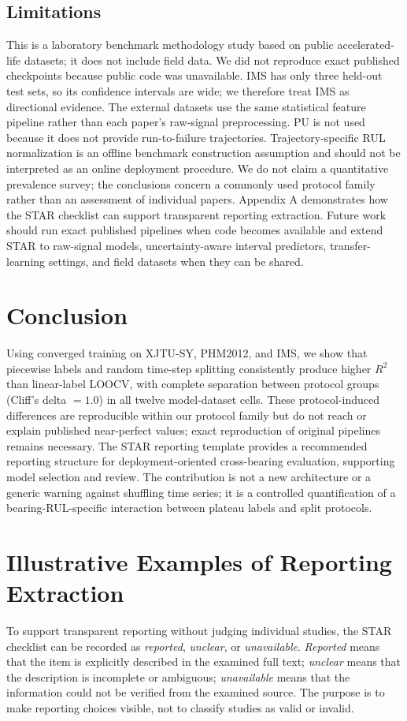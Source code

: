 \documentclass[pdflatex,sn-mathphys-num]{sn-jnl}
\begin{document}
\subsection{Limitations}
This is a laboratory benchmark methodology study based on public accelerated-life datasets; it does not include field data. We did not reproduce exact published checkpoints because public code was unavailable. IMS has only three held-out test sets, so its confidence intervals are wide; we therefore treat IMS as directional evidence. The external datasets use the same statistical feature pipeline rather than each paper's raw-signal preprocessing. PU is not used because it does not provide run-to-failure trajectories. Trajectory-specific RUL normalization is an offline benchmark construction assumption and should not be interpreted as an online deployment procedure. We do not claim a quantitative prevalence survey; the conclusions concern a commonly used protocol family rather than an assessment of individual papers. Appendix A demonstrates how the STAR checklist can support transparent reporting extraction. Future work should run exact published pipelines when code becomes available and extend STAR to raw-signal models, uncertainty-aware interval predictors, transfer-learning settings, and field datasets when they can be shared.

\section{Conclusion}
Using converged training on XJTU-SY, PHM2012, and IMS, we show that piecewise labels and random time-step splitting consistently produce higher $R^2$ than linear-label LOOCV, with complete separation between protocol groups (Cliff's delta $=1.0$) in all twelve model-dataset cells. These protocol-induced differences are reproducible within our protocol family but do not reach or explain published near-perfect values; exact reproduction of original pipelines remains necessary. The STAR reporting template provides a recommended reporting structure for deployment-oriented cross-bearing evaluation, supporting model selection and review. The contribution is not a new architecture or a generic warning against shuffling time series; it is a controlled quantification of a bearing-RUL-specific interaction between plateau labels and split protocols.

\appendix
\section{Illustrative Examples of Reporting Extraction}
To support transparent reporting without judging individual studies, the STAR checklist can be recorded as \emph{reported}, \emph{unclear}, or \emph{unavailable}. \emph{Reported} means that the item is explicitly described in the examined full text; \emph{unclear} means that the description is incomplete or ambiguous; \emph{unavailable} means that the information could not be verified from the examined source. The purpose is to make reporting choices visible, not to classify studies as valid or invalid.
\end{document}
